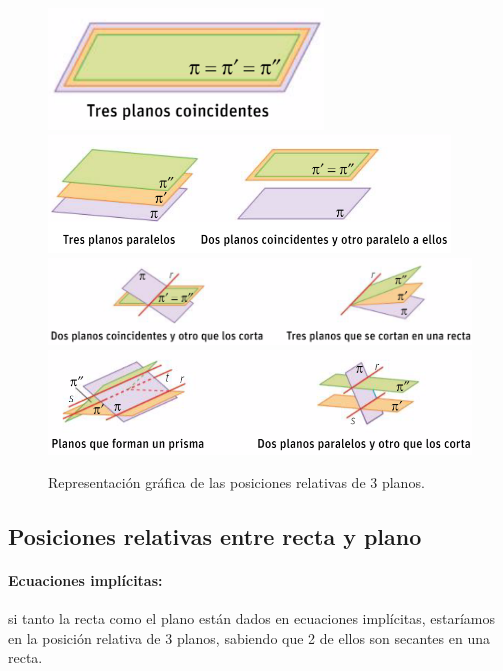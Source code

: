 \begin{figure}[hptb]
    \centering
    \includegraphics[width=0.65\textwidth]{img/Captura1.png}
    \includegraphics[width=0.95\textwidth]{img/Captura2.png}
    \includegraphics[width=1.1\textwidth]{img/Captura3.png}
    \includegraphics[width=1.1\textwidth]{img/Captura4.png}
    \caption{Representación gráfica de las posiciones relativas de 3 planos.}
    \label{fig:PosicionesRelativasPlanos}
\end{figure}




\subsection{Posiciones relativas entre recta y plano}

\paragraph{Ecuaciones implícitas: } si tanto la recta como el plano están dados en ecuaciones implícitas, estaríamos en la posición relativa de 3 planos, sabiendo que 2 de ellos son secantes en una recta.

